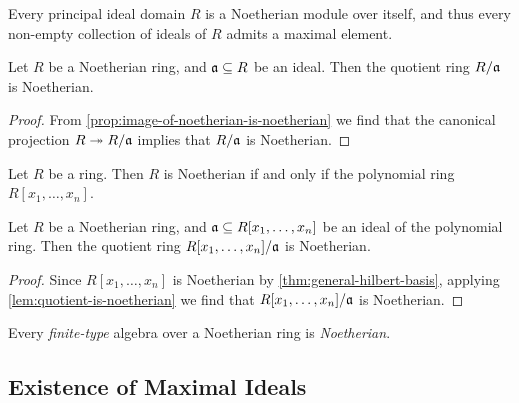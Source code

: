 \begin{corollary}
    \label{cor:pid-is-noetherian}
    Every principal ideal domain \(R\) is a Noetherian module over itself, and thus
    every non-empty collection of ideals of \(R\) admits a maximal element.
\end{corollary}

\begin{lemma}
    \label{lem:quotient-is-noetherian}
    Let \(R\) be a Noetherian ring, and \(\mathfrak{a} \subseteq R\) be an ideal. Then
    the quotient ring \(R/\mathfrak{a}\) is Noetherian.
\end{lemma}

\begin{proof}
    From \cref{prop:image-of-noetherian-is-noetherian} we find that the canonical
    projection \(R \twoheadrightarrow R/\mathfrak{a}\) implies that \(R/\mathfrak{a}\) is Noetherian.
\end{proof}

\begin{theorem}
    \label{thm:general-hilbert-basis}
    Let \(R\) be a ring. Then \(R\) is Noetherian if and only if the polynomial ring
    \(R[x_1, \dots, x_n]\).
\end{theorem}


\begin{corollary}
    \label{cor:noetherian-quotient-poly-ring}
    Let \(R\) be a Noetherian ring, and \(\mathfrak{a} \subseteq R[x_1, \dots, x_n]\)
    be an ideal of the polynomial ring. Then the quotient ring
    \(R[x_1, \dots, x_n]/\mathfrak{a}\) is Noetherian.
\end{corollary}

\begin{proof}
    Since \(R[x_1, \dots, x_n]\) is Noetherian by \cref{thm:general-hilbert-basis},
    applying \cref{lem:quotient-is-noetherian} we find that \(R[x_1, \dots,
            x_n]/\mathfrak{a}\) is Noetherian.
\end{proof}

\begin{corollary}
    \label{cor:finite-type-alg-noetherian}
    Every \emph{finite-type} algebra over a Noetherian ring is \emph{Noetherian}.
\end{corollary}

\subsection{Existence of Maximal Ideals}


